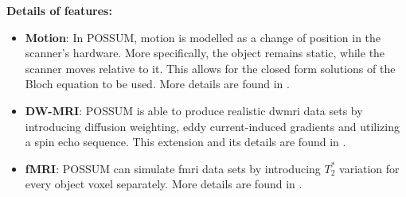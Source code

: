 
\hfill

\textbf{Details of features:}
\begin{itemize}
    
    \item \textbf{Motion}: In POSSUM, motion is modelled as a change of position in the scanner's hardware. 
    More specifically, the object remains static, while the scanner moves relative to it.
    This allows for the closed form solutions of the Bloch equation to be used.
    More details are found in \cite{Drobnjak2006}.
    
    \item \textbf{DW-MRI}: POSSUM is able to produce realistic \ac{dwmri} data sets by introducing diffusion weighting, eddy current-induced gradients and utilizing a spin echo sequence.
    This extension and its details are found in \cite{Graham2016}.
    
    \item \textbf{fMRI}: POSSUM can simulate \ac{fmri} data sets by introducing $T_2^*$ variation for every object voxel separately.
    More details are found in \cite{Drobnjak2006}.

\end{itemize}

\hfill

